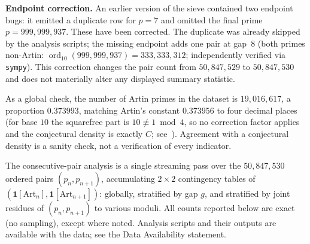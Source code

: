 \documentclass[11pt]{amsart}
\theoremstyle{definition}
\newcommand{\Art}{\mathrm{Art}}
\begin{document}
\textbf{Endpoint correction.} An earlier version of the sieve contained two
endpoint bugs: it emitted a duplicate row for $p = 7$ and omitted the final
prime $p = 999{,}999{,}937$. These have been corrected. The duplicate was
already skipped by the analysis scripts; the missing endpoint adds one pair
at gap~$8$ (both primes non-Artin: $\operatorname{ord}_{10}(999{,}999{,}937) =
	333{,}333{,}312$; independently verified via \texttt{sympy}). This correction
changes the pair count from $50{,}847{,}529$ to $50{,}847{,}530$ and does not
materially alter any displayed summary statistic.

As a global check, the number of Artin primes in the dataset is
$19{,}016{,}617$, a proportion $0.373993$, matching Artin's constant
$0.373956$ to four decimal places (for base $10$ the squarefree part is
$10 \not\equiv 1 \bmod 4$, so no correction factor applies and the conjectural
density is exactly $C$; see~\cite{Hooley1967,Moree2012}). Agreement with a
conjectural density is a sanity check, not a verification of every indicator.

\begin{sloppypar}
The consecutive-pair analysis is a single streaming pass over the
$50{,}847{,}530$ ordered pairs $(p_n, p_{n+1})$, accumulating $2 \times 2$
contingency tables of $(\mathbf{1}[\Art_n], \mathbf{1}[\Art_{n+1}])$:
globally, stratified by gap $g$, and stratified by joint residues of
$(p_n, p_{n+1})$ to various moduli. All counts reported below are exact
(no sampling), except where noted. Analysis scripts and their outputs are
available with the data; see the Data Availability statement.
\end{sloppypar}
\end{document}
